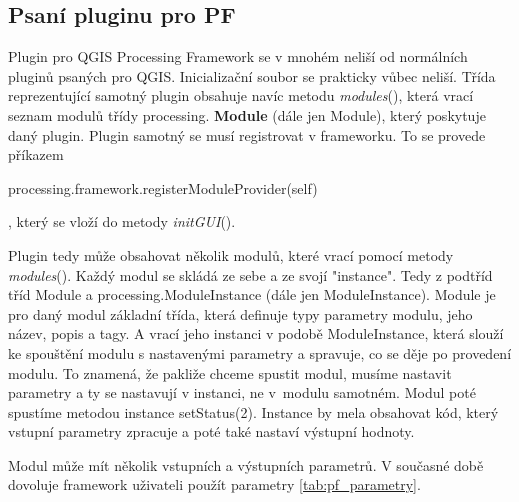 \subsection{Psaní pluginu pro PF}
Plugin pro QGIS Processing Framework se v mnohém neliší od normálních
pluginů psaných pro QGIS. Inicializační soubor se prakticky vůbec
neliší. Třída reprezentující samotný plugin obsahuje navíc
metodu \textit{modules}(), která vrací seznam modulů třídy
processing. \textbf{Module} (dále jen Module), který poskytuje daný
plugin. Plugin samotný se musí registrovat v frameworku. To se provede
příkazem \begin{scriptsize}processing.framework.registerModule\-Provider(self)\end{scriptsize},
který se vloží do metody \textit{initGUI}().

Plugin tedy může obsahovat několik modulů, které vrací pomocí
metody \textit{modules}(). Každý modul se skládá ze sebe a ze svojí
"instance". Tedy z podtříd tříd Module a processing.ModuleInstance
(dále jen ModuleInstance). Module je pro daný modul základní třída,
která definuje typy parametry modulu, jeho název, popis a tagy. A
vrací jeho instanci v podobě ModuleInstance, která slouží ke spouštění
modulu s nastavenými parametry a spravuje, co se děje po provedení
modulu. To znamená, že pakliže chceme spustit modul, musíme nastavit
parametry a ty se nastavují v instanci, ne v~modulu samotném. Modul
poté spustíme metodou instance setStatus(2). Instance by mela
obsahovat kód, který vstupní parametry zpracuje a poté také nastaví
výstupní hodnoty.

Modul může mít několik vstupních a výstupních parametrů. V současné
době dovoluje framework uživateli použít
parametry \ref{tab:pf_parametry}.


